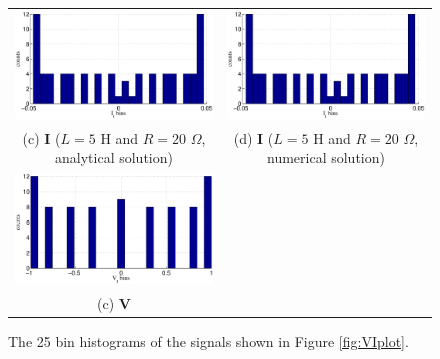 \begin{figure}[ht]
\begin{center}
\begin{tabular}{cc}
\includegraphics[scale=0.48]{IRCircuitResponseExampleL5R20_Yhist_an.eps} &
\includegraphics[scale=0.48]{IRCircuitResponseExampleL5R20_Yhist_num.eps} \\
(c) $\mathbf{I}$ ($L=5$ H and $R=20$ $\Omega$, analytical solution) & (d) $\mathbf{I}$ ($L=5$ H and $R=20$ $\Omega$, numerical solution)\\
\includegraphics[scale=0.48]{IRCircuitResponseExampleL10R5_Xhist.eps} \\
(c) $\mathbf{V}$
\end{tabular}
\end{center}
\caption{The 25 bin histograms of the signals shown in Figure \ref{fig:VIplot}.}
\label{fig:VIhist}
\end{figure}

